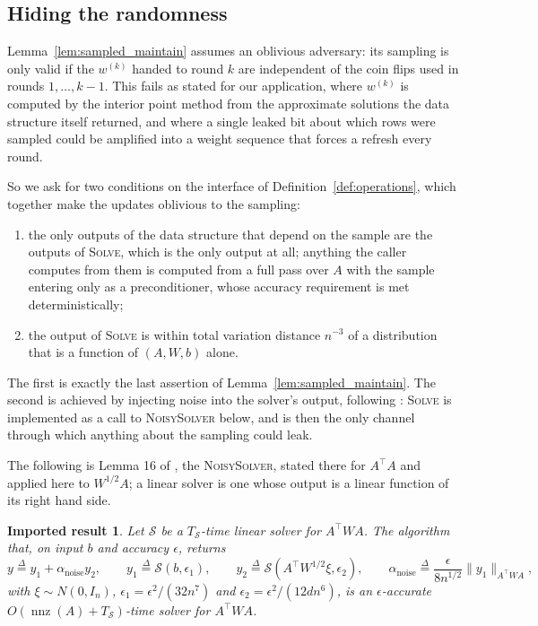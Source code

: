 \documentclass[11pt]{article}
\newtheorem{importedresult}{Imported result}[section]
\newcommand{\nnz}{\operatorname{nnz}}
\newcommand{\defeq}{\stackrel{\Delta}{=}}
\begin{document}
\subsection{Hiding the randomness}
\label{subsec:randomness}

Lemma~\ref{lem:sampled_maintain} assumes an oblivious adversary: its sampling is
only valid if the $w^{(k)}$ handed to round
$k$ are independent of the coin flips used in rounds
$1, \ldots, k - 1$.
This fails as stated for our application, where $w^{(k)}$ is computed by the
interior point method from the approximate solutions the data structure itself
returned, and where a single leaked bit about which rows were sampled could be
amplified into a weight sequence that forces a refresh every round.

So we ask for two conditions on the interface of
Definition~\ref{def:operations}, which together make the updates oblivious to
the sampling:
\begin{enumerate}
\item the only outputs of the data structure that depend on the sample are the
  outputs of \textsc{Solve}, which is the only output at all; anything the
  caller computes from them is computed from a full pass over $A$ with the
  sample entering only as a preconditioner, whose accuracy requirement is met
  deterministically;
\item the output of \textsc{Solve} is within total variation distance $n^{-3}$
  of a distribution that is a function of $(A, W, b)$ alone.
\end{enumerate}
The first is exactly the last assertion of Lemma~\ref{lem:sampled_maintain}.
The second is achieved by injecting noise into the solver's output, following
\cite[Section 5]{LS15}: \textsc{Solve} is implemented as a call to
\textsc{NoisySolver} below, and is then the only channel through which anything
about the sampling could leak.

The following is Lemma 16 of \cite{LS15}, the
\textsc{NoisySolver}, stated there for $A^\top A$ and applied here to
$W^{1/2} A$; a linear solver is one whose output is a linear function of its
right hand side.

\begin{importedresult}
\label{imp:noisysolver}
Let $\mathcal{S}$ be a
$T_{\mathcal{S}}$-time linear solver for
$A^\top W A$.
The algorithm that, on input $b$ and accuracy
$\epsilon$, returns
\[
y \defeq y_1 + \alpha_{\mathrm{noise}} y_2,
\qquad
y_1 \defeq \mathcal{S}(b, \epsilon_1),
\qquad
y_2 \defeq \mathcal{S}(A^\top W^{1/2} \xi, \epsilon_2),
\qquad
\alpha_{\mathrm{noise}}
\defeq \frac{\epsilon}{8 n^{1/2}} \|y_1\|_{A^\top W A},
\]
with $\xi \sim N(0, I_n)$,
$\epsilon_1 = \epsilon^2 / (32 n^7)$ and
$\epsilon_2 = \epsilon^2 / (12 d n^6)$, is an
$\epsilon$-accurate
$O(\nnz(A) + T_{\mathcal{S}})$-time solver for
$A^\top W A$.
\end{importedresult}
\end{document}
